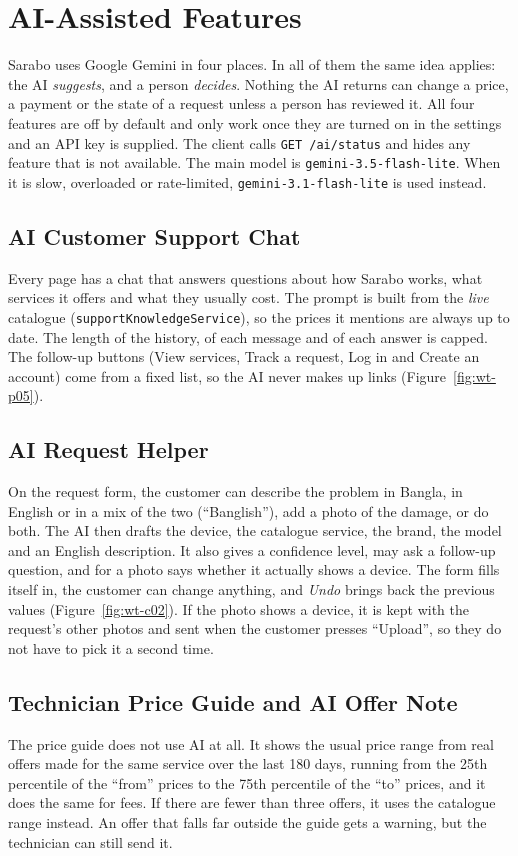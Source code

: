 \documentclass{standalone}
\begin{document}
\chapter{AI-Assisted Features}
\label{ch:ai}

Sarabo uses Google Gemini in four places. In all of them the same idea applies: the AI \emph{suggests}, and a person \emph{decides}. Nothing the AI returns can change a price, a payment or the state of a request unless a person has reviewed it. All four features are off by default and only work once they are turned on in the settings and an API key is supplied. The client calls \texttt{GET /ai/status} and hides any feature that is not available. The main model is \texttt{gemini-3.5-flash-lite}. When it is slow, overloaded or rate-limited, \texttt{gemini-3.1-flash-lite} is used instead.

\section{AI Customer Support Chat}
Every page has a chat that answers questions about how Sarabo works, what services it offers and what they usually cost. The prompt is built from the \emph{live} catalogue (\texttt{supportKnowledgeService}), so the prices it mentions are always up to date. The length of the history, of each message and of each answer is capped. The follow-up buttons (View services, Track a request, Log in and Create an account) come from a fixed list, so the AI never makes up links (Figure~\ref{fig:wt-p05}).

\section{AI Request Helper}
On the request form, the customer can describe the problem in Bangla, in English or in a mix of the two (``Banglish''), add a photo of the damage, or do both. The AI then drafts the device, the catalogue service, the brand, the model and an English description. It also gives a confidence level, may ask a follow-up question, and for a photo says whether it actually shows a device. The form fills itself in, the customer can change anything, and \emph{Undo} brings back the previous values (Figure~\ref{fig:wt-c02}). If the photo shows a device, it is kept with the request's other photos and sent when the customer presses ``Upload'', so they do not have to pick it a second time.

\section{Technician Price Guide and AI Offer Note}
The price guide does not use AI at all. It shows the usual price range from real offers made for the same service over the last 180 days, running from the 25th percentile of the ``from'' prices to the 75th percentile of the ``to'' prices, and it does the same for fees. If there are fewer than three offers, it uses the catalogue range instead. An offer that falls far outside the guide gets a warning, but the technician can still send it.
\end{document}
